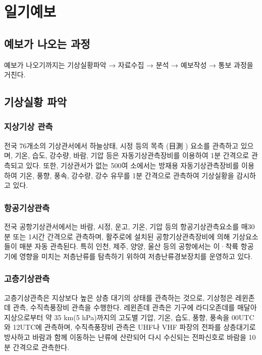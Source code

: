 
\chapter{일기예보}



\section{예보가 나오는 과정}

예보가 나오기까지는 기상실황파악 → 자료수집 → 분석 → 예보작성 → 통보 과정을 거친다. 


\section{기상실황 파악}

\subsection{지상기상 관측}
전국 76개소의 기상관서에서 하늘상태, 시정 등의 목측 (目測 ) 요소를 관측하고 있으며, 기온, 습도, 강수량, 바람, 기압 등은 자동기상관측장비를 이용하여 1분 간격으로 관측되고 있다. 또한, 기상관서가 없는 500여 소에서는 방재용 자동기상관측장비를 이용하여 기온, 풍향, 풍속, 강수량, 강수 유무를 1분 간격으로 관측하여 기상실황을 감시하고 있다.

\subsection{항공기상관측}
전국 공항기상관서에서는 바람, 시정, 운고, 기온, 기압 등의 항공기상관측요소를 매30분 또는 1시간 간격으로 관측하며, 활주로에 설치된 공항기상관측장비에 의해 기상요소들이 매분 자동 관측된다. 특히 인천, 제주, 양양, 울산 등의 공항에서는 이·착륙 항공기에 영향을 미치는 저층난류를 탐측하기 위하여 저층난류경보장치를 운영하고 있다.

\subsection{고층기상관측}
고층기상관측은 지상보다 높은 상층 대기의 상태를 관측하는 것으로, 기상청은 레윈존데 관측, 수직측풍장비 관측을 수행한다. 레윈존데 관측은 기구에 라디오존데를 매달아 지상으로부터 약 35 km(5 hPa)까지의 고도별 기압, 기온, 습도, 풍향, 풍속을 00UTC와 12UTC에 관측하며, 수직측풍장비 관측은 UHF나 VHF 파장의 전파를 상층대기로 방사하고 바람과 함께 이동하는 난류에 산란되어 다시 수신되는 전파신호로 바람을 10분 간격으로 관측한다.

